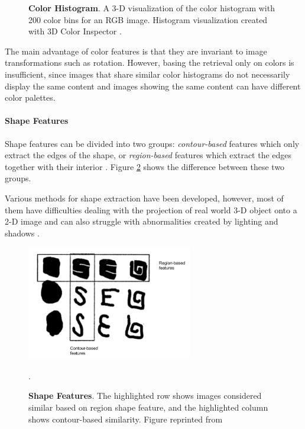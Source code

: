 \documentclass{article}
\begin{document}
\begin{figure}[h]
\centering
{}
\caption{\label{fig:color_hist} \textbf{Color Histogram}. A 3-D visualization of the color histogram with 200 color bins for an RGB image. Histogram visualization created with 3D Color Inspector \cite{barthel_3d_nodate}.}
\end{figure}

The main advantage of color features is that they are invariant to image transformations such as rotation. However, basing the retrieval only on colors is insufficient, since images that share similar color histograms do not necessarily display the same content and images showing the same content can have different color palettes.


\paragraph{Shape Features}
Shape features can be divided into two groups: \textit{contour-based} features which only extract the edges of the shape, or \textit{region-based} features which extract the edges together with their interior \cite{zhang2004review}. Figure \ref{fig:shape_feat} shows the difference between these two groups.

Various methods for shape extraction have been developed, however, most of them have difficulties dealing with the projection of real world 3-D object onto a 2-D image and can also struggle with abnormalities created by lighting and shadows \cite{zhang2004review}.

\begin{figure}[h]
\centering
{\includegraphics[height=5cm]{CBIR/shape_features}}
\caption{\label{fig:shape_feat} \textbf{Shape Features}. The highlighted row shows images considered similar based on region shape feature, and the highlighted column shows contour-based similarity. Figure reprinted from \cite{bober_mpeg-7_2001}}.
\end{figure}
\end{document}
